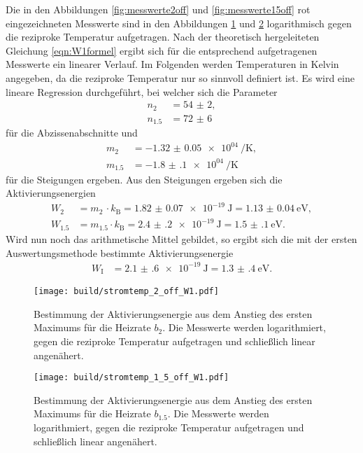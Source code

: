 Die in den Abbildungen \ref{fig:messwerte2off} und \ref{fig:messwerte15off} rot
eingezeichneten Messwerte sind in den Abbildungen \ref{fig:messwerte2offW1} und
\ref{fig:messwerte15offW1} logarithmisch gegen die reziproke Temperatur
aufgetragen. Nach der theoretisch hergeleiteten Gleichung \eqref{eqn:W1formel}
ergibt sich für die entsprechend aufgetragenen Messwerte ein linearer Verlauf.
Im Folgenden werden Temperaturen in Kelvin angegeben, da die reziproke
Temperatur nur so sinnvoll definiert ist. Es wird eine lineare Regression durchgeführt,
bei welcher sich die Parameter
\begin{align}
  n_{2} &= \num{54(2)}, \\
  n_{1.5} &= \num{72(6)}
\end{align}
für die Abzissenabschnitte und
\begin{align}
  m_{2} &= \SI{-1.32(5)e04}{\per\kelvin}, \\
  m_{1.5} &= \SI{-1.8(1)e04}{\per\kelvin}
\end{align}
für die Steigungen ergeben. Aus den Steigungen ergeben sich die Aktivierungsenergien
\begin{align}
  W_{2} &= m_{2} \, \cdot k_\text{B} = \SI{1.82(7)e-19}{\joule} = \SI{1.13(4)}{\electronvolt}, \\
  W_{1.5} &= m_{1.5} \cdot k_\text{B} = \SI{2.4(2)e-19}{\joule} = \SI{1.5(1)}{\electronvolt}.
\end{align}
Wird nun noch das arithmetische Mittel gebildet, so ergibt sich die mit der ersten
Auswertungsmethode bestimmte Aktivierungsenergie
\begin{align}
  W_{\text{I}} &= \SI{2.1(6)e-19}{\joule} = \SI{1.3(4)}{\electronvolt}.
\end{align}

\begin{figure}
  \centering
  \texttt{[image: build/stromtemp\_2\_off\_W1.pdf]}
  \caption{Bestimmung der Aktivierungsenergie aus dem Anstieg des ersten Maximums für die Heizrate $b_{2}$.
  Die Messwerte werden logarithmiert, gegen die reziproke Temperatur aufgetragen und schließlich linear angenähert.}
  \label{fig:messwerte2offW1}
\end{figure}

\begin{figure}
  \centering
  \texttt{[image: build/stromtemp\_1\_5\_off\_W1.pdf]}
  \caption{Bestimmung der Aktivierungsenergie aus dem Anstieg des ersten Maximums für die Heizrate $b_{1.5}$.
  Die Messwerte werden logarithmiert, gegen die reziproke Temperatur aufgetragen und schließlich linear angenähert.}
  \label{fig:messwerte15offW1}
\end{figure}

